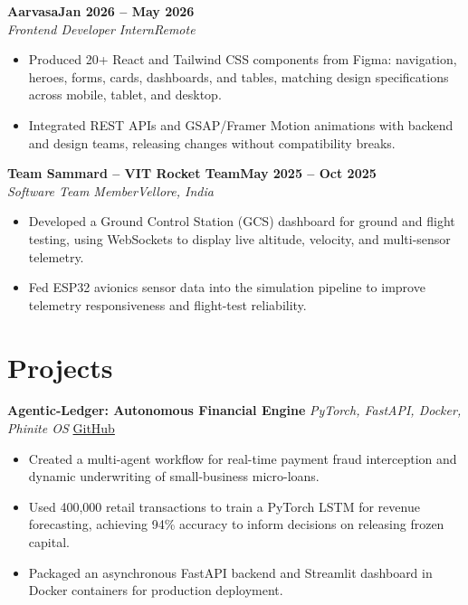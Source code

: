 \documentclass[letterpaper,10pt]{article}
\newcommand{\role}[4]{%
  \textbf{#1}\hfill\textbf{#2}\\
  \textit{#3}\hfill\textit{#4}\par}
\newcommand{\project}[3]{%
  \textbf{#1} \textbar{} \textit{#2} \textbar{} \href{#3}{GitHub}\par}
\begin{document}
\role{Aarvasa}{Jan 2026 -- May 2026}{Frontend Developer Intern}{Remote}
\begin{itemize}
  \item Produced 20+ React and Tailwind CSS components from Figma: navigation, heroes, forms, cards, dashboards, and tables, matching design specifications across mobile, tablet, and desktop.
  \item Integrated REST APIs and GSAP/Framer Motion animations with backend and design teams, releasing changes without compatibility breaks.
\end{itemize}
\vspace{2pt}

\role{Team Sammard -- VIT Rocket Team}{May 2025 -- Oct 2025}{Software Team Member}{Vellore, India}
\begin{itemize}
  \item Developed a Ground Control Station (GCS) dashboard for ground and flight testing, using WebSockets to display live altitude, velocity, and multi-sensor telemetry.
  \item Fed ESP32 avionics sensor data into the simulation pipeline to improve telemetry responsiveness and flight-test reliability.
\end{itemize}

\section{Projects}

\project{Agentic-Ledger: Autonomous Financial Engine}{PyTorch, FastAPI, Docker, Phinite OS}{https://github.com/Vaibhav8075/Agentic-Ledger}
\begin{itemize}
  \item Created a multi-agent workflow for real-time payment fraud interception and dynamic underwriting of small-business micro-loans.
  \item Used 400,000 retail transactions to train a PyTorch LSTM for revenue forecasting, achieving 94\% accuracy to inform decisions on releasing frozen capital.
  \item Packaged an asynchronous FastAPI backend and Streamlit dashboard in Docker containers for production deployment.
\end{itemize}
\vspace{2pt}
\end{document}
